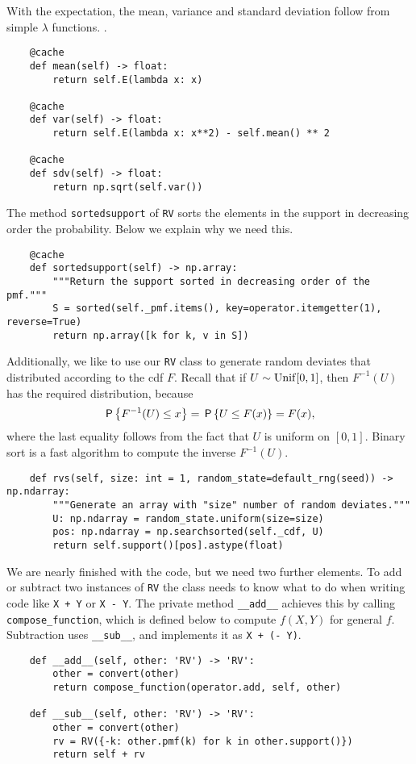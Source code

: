 \documentclass[stochastic-or]{subfiles}
\begin{document}
With the expectation, the mean, variance and standard deviation follow from simple \(\lambda\) functions. .
\begin{verbatim}
    @cache
    def mean(self) -> float:
        return self.E(lambda x: x)

    @cache
    def var(self) -> float:
        return self.E(lambda x: x**2) - self.mean() ** 2

    @cache
    def sdv(self) -> float:
        return np.sqrt(self.var())
\end{verbatim}

The method \texttt{sortedsupport} of \texttt{RV} sorts the elements in the support in decreasing order the probability. Below we explain why we need this.
\begin{verbatim}
    @cache
    def sortedsupport(self) -> np.array:
        """Return the support sorted in decreasing order of the pmf."""
        S = sorted(self._pmf.items(), key=operator.itemgetter(1), reverse=True)
        return np.array([k for k, v in S])
\end{verbatim}


Additionally, we like to use our \texttt{RV} class to generate random deviates that distributed according to the cdf \(F\).
Recall that if \(U\sim \Unif{[0,1]}\), then \(F^{-1}(U)\) has the required distribution, because
\begin{equation*}
\P{F^{-1}(U) \leq x} = \P{U \leq F(x)} = F(x),
\end{equation*}
where the last equality follows from the fact that \(U\) is uniform on \([0,1]\).
Binary sort is a fast algorithm to compute the inverse \(F^{-1}(U)\).
\begin{verbatim}
    def rvs(self, size: int = 1, random_state=default_rng(seed)) -> np.ndarray:
        """Generate an array with "size" number of random deviates."""
        U: np.ndarray = random_state.uniform(size=size)
        pos: np.ndarray = np.searchsorted(self._cdf, U)
        return self.support()[pos].astype(float)
\end{verbatim}


We are nearly finished with the code, but we need two further elements.
To add or subtract two instances of \texttt{RV} the class needs to know what to do when writing code like \texttt{X + Y} or \texttt{X - Y}.
The private method \texttt{\_\_add\_\_} achieves this by calling \texttt{compose\_function}, which is defined below to compute \(f(X, Y)\) for general \(f\).
Subtraction uses  \texttt{\_\_sub\_\_}, and implements it as \texttt{X + (- Y)}.
\begin{verbatim}
    def __add__(self, other: 'RV') -> 'RV':
        other = convert(other)
        return compose_function(operator.add, self, other)

    def __sub__(self, other: 'RV') -> 'RV':
        other = convert(other)
        rv = RV({-k: other.pmf(k) for k in other.support()})
        return self + rv
\end{verbatim}
\end{document}
